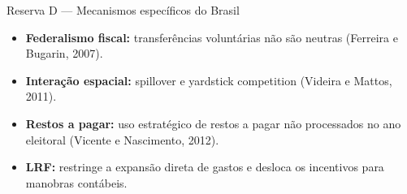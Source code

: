 \documentclass[aspectratio=169,9pt]{beamer}
\begin{document}
\begin{frame}{Reserva D --- Mecanismos específicos do Brasil}
  \begin{itemize}
    \item \textbf{Federalismo fiscal:} transferências voluntárias não são neutras (Ferreira e Bugarin, 2007).
    \item \textbf{Interação espacial:} spillover e yardstick competition (Videira e Mattos, 2011).
    \item \textbf{Restos a pagar:} uso estratégico de restos a pagar não processados no ano eleitoral (Vicente e Nascimento, 2012).
    \item \textbf{LRF:} restringe a expansão direta de gastos e desloca os incentivos para manobras contábeis.
  \end{itemize}
\end{frame}
\end{document}
